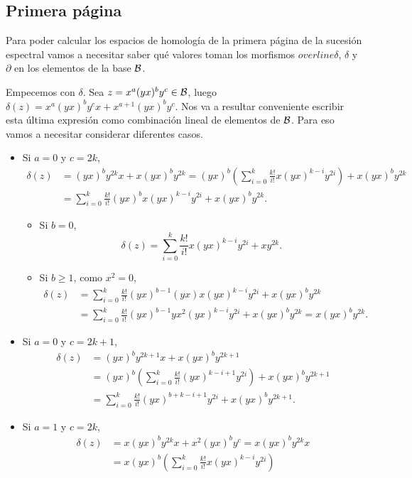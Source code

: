 \documentclass[fleqn,../tesis.tex]{subfiles}
\begin{document}
\subsection{Primera página}
Para poder calcular los espacios de homología de la primera página de la sucesión espectral
vamos a necesitar saber qué valores toman los morfismos $overline{\delta}$, $\delta$ y $\partial$
en los elementos de la base $\mathcal{B}$.

Empecemos con $\delta$. Sea $z = x^a(yx)^by^c \in \mathcal{B}$, luego $\delta(z) = x^a(yx)^by^cx + x^{a + 1}(yx)^by^c$. Nos va a
resultar conveniente escribir esta última expresión como combinación lineal de elementos de $\mathcal{B}$. Para eso vamos a necesitar considerar
diferentes casos.
\begin{itemize}
\item Si $a = 0$ y $c = 2k$,
\begin{align*}
	\delta(z) &= (yx)^by^{2k}x + x(yx)^by^{2k} = (yx)^b\left( \sum_{i = 0}^k\frac{k!}{i!}x(yx)^{k - i}y^{2i}\right) + x(yx)^by^{2k} \\
	&= \sum_{i = 0}^k\frac{k!}{i!}(yx)^bx(yx)^{k - i}y^{2i} + x(yx)^by^{2k}. 
\end{align*}
\begin{itemize}
\item Si $b = 0$,
\[
	\delta(z) = \sum_{i = 0}^k\frac{k!}{i!}x(yx)^{k - i}y^{2i} + xy^{2k}.
\]
\item Si $b \geq 1$, como $x^2 = 0$,
\begin{align*}
	\delta(z) &= \sum_{i = 0}^k\frac{k!}{i!}(yx)^{b-1}(yx)x(yx)^{k - i}y^{2i} + x(yx)^by^{2k} \\
	&= \sum_{i = 0}^k\frac{k!}{i!}(yx)^{b-1}yx^2(yx)^{k - i}y^{2i} + x(yx)^by^{2k} = x(yx)^by^{2k}.
\end{align*}
\end{itemize}
\item Si $a = 0$ y $c = 2k + 1$,
\begin{align*}
	\delta(z) &= (yx)^by^{2k + 1}x + x(yx)^by^{2k + 1} \\
	&= (yx)^b\left( \sum_{i = 0}^k\frac{k!}{i!}(yx)^{k - i + 1}y^{2i}\right) + x(yx)^by^{2k + 1} \\
	&= \sum_{i = 0}^k\frac{k!}{i!}(yx)^{b + k - i + 1}y^{2i} + x(yx)^by^{2k + 1}.
\end{align*}
\item Si $a = 1$ y $c = 2k$,
	\begin{align*}
		\delta(z) &= x(yx)^by^{2k}x + x^2(yx)^by^c = x(yx)^by^{2k}x \\
		&= x(yx)^b\left( \sum_{i = 0}^k\frac{k!}{i!}x(yx)^{k - i}y^{2i}\right) \\

\end{align*}
\end{itemize}
\end{document}
